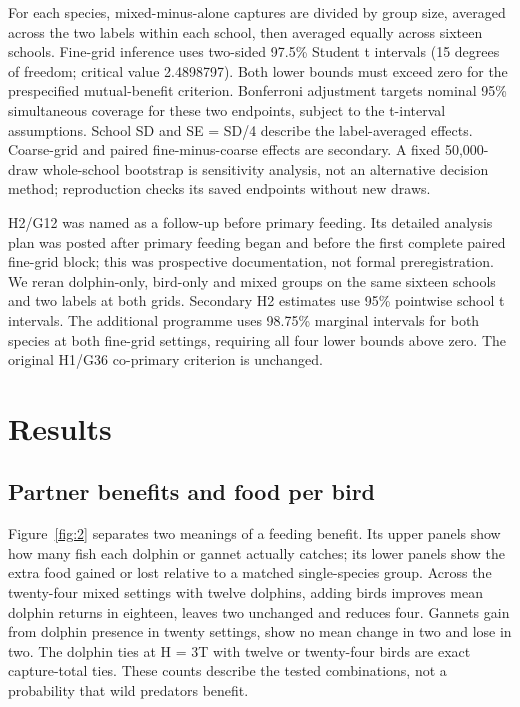 \documentclass[10pt,a4paper,twocolumn]{article}
\begin{document}
For each species, mixed-minus-alone captures are divided by group size, averaged across the two labels within each school, then averaged equally across sixteen schools. Fine-grid inference uses two-sided 97.5\% Student t intervals (15 degrees of freedom; critical value 2.4898797). Both lower bounds must exceed zero for the prespecified mutual-benefit criterion. Bonferroni adjustment targets nominal 95\% simultaneous coverage for these two endpoints, subject to the t-interval assumptions. School SD and SE = SD/4 describe the label-averaged effects. Coarse-grid and paired fine-minus-coarse effects are secondary. A fixed 50,000-draw whole-school bootstrap is sensitivity analysis, not an alternative decision method; reproduction checks its saved endpoints without new draws.

H2/G12 was named as a follow-up before primary feeding. Its detailed analysis plan was posted after primary feeding began and before the first complete paired fine-grid block; this was prospective documentation, not formal preregistration. We reran dolphin-only, bird-only and mixed groups on the same sixteen schools and two labels at both grids. Secondary H2 estimates use 95\% pointwise school t intervals. The additional programme uses 98.75\% marginal intervals for both species at both fine-grid settings, requiring all four lower bounds above zero. The original H1/G36 co-primary criterion is unchanged.

\section{Results}
\subsection{Partner benefits and food per bird}
Figure~\ref{fig:2} separates two meanings of a feeding benefit. Its upper panels show how many fish each dolphin or gannet actually catches; its lower panels show the extra food gained or lost relative to a matched single-species group. Across the twenty-four mixed settings with twelve dolphins, adding birds improves mean dolphin returns in eighteen, leaves two unchanged and reduces four. Gannets gain from dolphin presence in twenty settings, show no mean change in two and lose in two. The dolphin ties at H = 3T with twelve or twenty-four birds are exact capture-total ties. These counts describe the tested combinations, not a probability that wild predators benefit.
\end{document}
